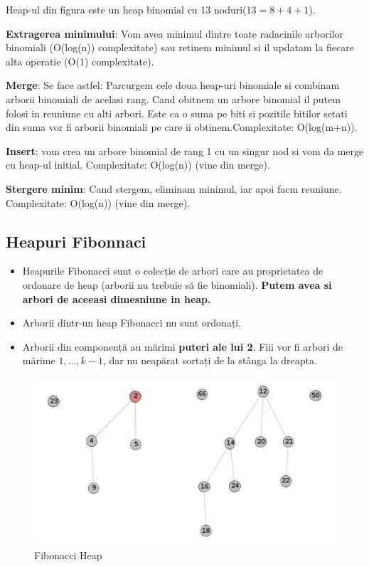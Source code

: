\documentclass[11pt,a4paper]{article}
\theoremstyle{definition}
\theoremstyle{plain}
\theoremstyle{remark}
\begin{document}
Heap-ul din figura este un heap binomial cu 13 noduri($13 = 8 + 4 + 1$).

\textbf{Extragerea minimului}: Vom avea minimul dintre toate radacinile arborilor binomiali (O(log(n)) complexitate) sau retinem minimul si il updatam la fiecare alta operatie (O(1) complexitate).

\textbf{Merge}: Se face astfel: Parcurgem cele doua heap-uri binomiale si combinam arborii binomiali de acelasi rang. Cand obitnem un arbore binomial il putem folosi in reuniune cu alti arbori. Este ca o suma pe biti si pozitile bitilor setati din suma vor fi arborii binomiali pe care ii obtinem.Complexitate: O(log(m+n)).

\textbf{Insert}: vom crea un arbore binomial de rang 1 cu un singur nod si vom da merge cu heap-ul initial. Complexitate: O(log(n)) (vine din merge).

\textbf{Stergere minim}: Cand stergem, eliminam minimul, iar apoi facm reuniune. Complexitate: O(log(n)) (vine din merge).

\subsection{Heapuri Fibonnaci}

\begin{itemize}
    \item Heapurile Fibonacci sunt o colecție de arbori care au proprietatea de ordonare de heap (arborii nu trebuie să fie binomiali). \textbf{Putem avea si arbori de aceeasi dimesniune in heap.}
    \item Arborii dintr-un heap Fibonacci nu sunt ordonați.
    \item Arborii din componență au mărimi \textbf{puteri ale lui 2}. Fiii vor fi arbori de mărime $1,…, k-1$, dar nu neapărat sortați de la stânga la dreapta.
\end{itemize}

\begin{figure}[H]
    \centering
    \includegraphics[width=0.75\linewidth]{fibonacci-heap.png}
    \caption{Fibonacci Heap}
    \label{fig:enter-label}
\end{figure}
\end{document}
